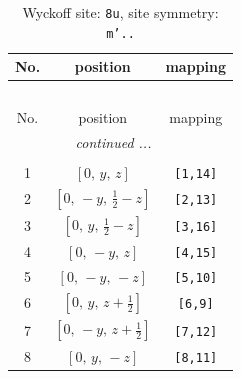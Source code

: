 \documentclass[fleqn,8pt]{jsarticle}
\begin{document}
\renewcommand{\arraystretch}{1.2}
\begin{longtable}{ccc}
\caption{Wyckoff site: {\tt 8u}, site symmetry: {\tt m'..}}
 \\
 \hline \hline
No. & position & mapping \\ \hline \endfirsthead

\multicolumn{2}{l}{\tablename\ \thetable{}} \\
 \hline \hline
No. & position & mapping \\ \hline \endhead

 \hline \hline
\multicolumn{2}{r}{\footnotesize\it continued ...} \\ \endfoot

 \hline \hline
\multicolumn{2}{r}{} \\ \endlastfoot

1 & $\left[ 0,\, y,\, z \right]$ & {\tt [1,14]} \\ \hline
2 & $\left[ 0,\, - y,\, \frac{1}{2} - z \right]$ & {\tt [2,13]} \\ \hline
3 & $\left[ 0,\, y,\, \frac{1}{2} - z \right]$ & {\tt [3,16]} \\ \hline
4 & $\left[ 0,\, - y,\, z \right]$ & {\tt [4,15]} \\ \hline
5 & $\left[ 0,\, - y,\, - z \right]$ & {\tt [5,10]} \\ \hline
6 & $\left[ 0,\, y,\, z + \frac{1}{2} \right]$ & {\tt [6,9]} \\ \hline
7 & $\left[ 0,\, - y,\, z + \frac{1}{2} \right]$ & {\tt [7,12]} \\ \hline
8 & $\left[ 0,\, y,\, - z \right]$ & {\tt [8,11]} \\
\end{longtable}
\renewcommand{\arraystretch}{1.2}
\end{document}
